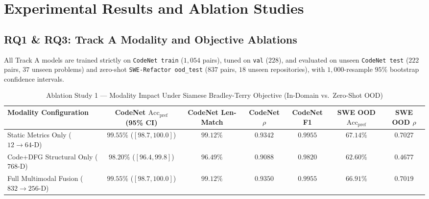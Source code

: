 \documentclass[conference]{IEEEtran}
\begin{document}
\section{Experimental Results and Ablation Studies}
\label{sec:results}

\subsection{RQ1 \& RQ3: Track A Modality and Objective Ablations}
All Track A models are trained strictly on \texttt{CodeNet train} ($1{,}054$ pairs), tuned on \texttt{val} ($228$), and evaluated on unseen \texttt{CodeNet test} ($222$ pairs, $37$ unseen problems) and zero-shot \texttt{SWE-Refactor ood\_test} ($837$ pairs, $18$ unseen repositories), with $1{,}000$-resample $95\%$ bootstrap confidence intervals.

\begin{table}[t]
\centering
\caption{Ablation Study 1 --- Modality Impact Under Siamese Bradley-Terry Objective (In-Domain vs.\ Zero-Shot OOD)}
\label{tab:ablation1}
\renewcommand{\arraystretch}{1.15}
\begin{tabular}{@{}lcccccc@{}}
\toprule
\textbf{Modality Configuration} & \textbf{CodeNet $\text{Acc}_{\text{pref}}$ (95\% CI)} & \textbf{CodeNet Len-Match} & \textbf{CodeNet $\rho$} & \textbf{CodeNet F1} & \textbf{SWE OOD $\text{Acc}_{\text{pref}}$} & \textbf{SWE OOD $\rho$} \\
\midrule
Static Metrics Only ($12 \to 64\text{-D}$) & $99.55\%$ ($[98.7, 100.0]$) & $99.12\%$ & $0.9342$ & $0.9955$ & $\mathbf{67.14\%}$ & $\mathbf{0.7027}$ \\
Code+DFG Structural Only ($768\text{-D}$) & $98.20\%$ ($[96.4, 99.8]$) & $96.49\%$ & $0.9088$ & $0.9820$ & $62.60\%$ & $0.4677$ \\
Full Multimodal Fusion ($832 \to 256\text{-D}$) & $\mathbf{99.55\%}$ ($[98.7, 100.0]$) & $\mathbf{99.12\%}$ & $\mathbf{0.9350}$ & $\mathbf{0.9955}$ & $66.91\%$ & $0.7019$ \\
\bottomrule
\end{tabular}
\end{table}
\end{document}
